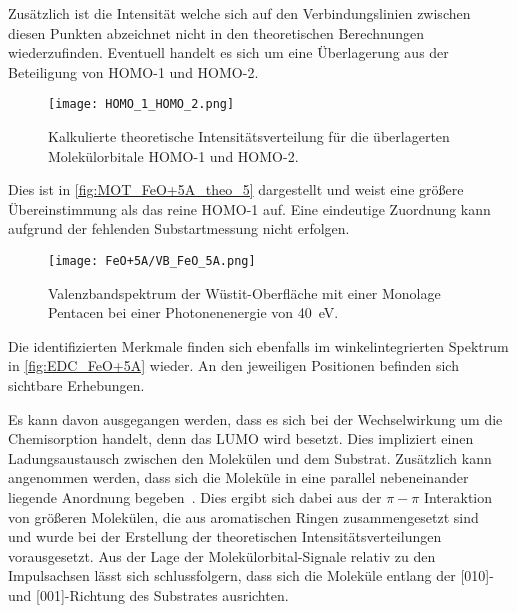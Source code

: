             Zusätzlich ist die Intensität welche sich auf den Verbindungslinien zwischen diesen Punkten abzeichnet nicht in den theoretischen Berechnungen wiederzufinden.
            Eventuell handelt es sich um eine Überlagerung aus der Beteiligung von HOMO-1 und HOMO-2.
            \begin{figure}
                \centering
                \texttt{[image: HOMO\_1\_HOMO\_2.png]}
                \caption{Kalkulierte theoretische Intensitätsverteilung für die überlagerten Molekülorbitale HOMO-1 und HOMO-2.} %
                \label{fig:MOT_FeO+5A_theo_5}
            \end{figure}
            Dies ist in \autoref{fig:MOT_FeO+5A_theo_5} dargestellt und weist eine größere Übereinstimmung als das reine HOMO-1 auf.
            Eine eindeutige Zuordnung kann aufgrund der fehlenden Substartmessung nicht erfolgen.

            \begin{figure}
                \centering
                \texttt{[image: FeO+5A/VB\_FeO\_5A.png]}
                \caption{Valenzbandspektrum der Wüstit-Oberfläche mit einer Monolage Pentacen bei einer Photonenenergie von \SI{40}{\electronvolt}.}
                \label{fig:EDC_FeO+5A}
            \end{figure}
            Die identifizierten Merkmale finden sich ebenfalls im winkelintegrierten Spektrum in \autoref{fig:EDC_FeO+5A} wieder.
            An den jeweiligen Positionen befinden sich sichtbare Erhebungen.

            Es kann davon ausgegangen werden, dass es sich bei der Wechselwirkung um die Chemisorption handelt, denn das LUMO wird besetzt.
            Dies impliziert einen Ladungsaustausch zwischen den Molekülen und dem Substrat.
            Zusätzlich kann angenommen werden, dass sich die Moleküle in eine parallel nebeneinander liegende Anordnung begeben~\cite{IF_13}.
            Dies ergibt sich dabei aus der $\pi-\pi$ Interaktion von größeren Molekülen, die aus aromatischen Ringen zusammengesetzt sind~\cite{IF_13} und wurde bei der Erstellung der theoretischen Intensitätsverteilungen vorausgesetzt.
            Aus der Lage der Molekülorbital-Signale relativ zu den Impulsachsen lässt sich schlussfolgern, dass sich die Moleküle entlang der [010]- und [001]-Richtung des Substrates ausrichten.

